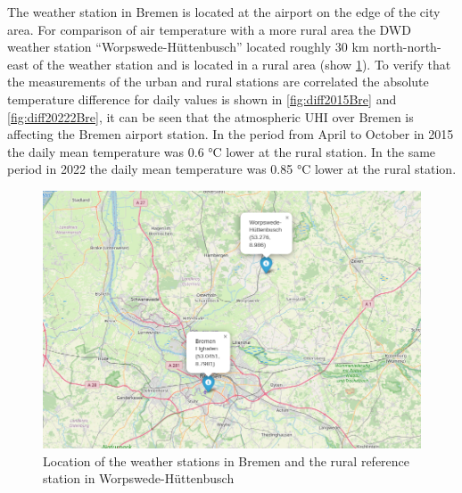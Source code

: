 \documentclass[12pt,a4paper, english,twoside]{scrartcl}
\begin{document}
      The weather station in Bremen is located at the airport on the edge of the city area. %
      For comparison of air temperature with a more rural area the \gls{DWD} weather station ``Worpswede-Hüttenbusch'' located roughly 30 km north-north-east of the weather station and is located in a rural area (show \cref{fig:mapWeatherstationsBremen}).
      To verify that the measurements of the urban and rural stations are correlated the absolute temperature difference for daily values is shown in \cref{fig:diff2015Bre} and \cref{fig:diff20222Bre}, it can be seen that the atmospheric \gls{UHI} over Bremen is affecting the Bremen airport station. 
      In the period from April to October in 2015 the daily mean temperature was 0.6 °C lower at the rural station. 
      In the same period in 2022 the daily mean temperature was 0.85 °C lower at the rural station. 
      \begin{figure}[!htbp]
         \centering
            \includegraphics[width=\textwidth]{img/MapWetterstationenBremen.jpeg}
             \caption{Location of the weather stations in Bremen and the rural reference station in Worpswede-Hüttenbusch}\label{fig:mapWeatherstationsBremen}
      \end{figure}
\end{document}
